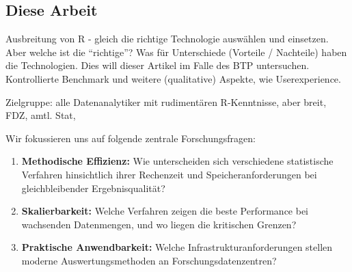 \documentclass[
  german,
  10pt,
  twoside]{article}
\begin{document}
\subsection{Diese Arbeit}\label{diese-arbeit}

Ausbreitung von R - gleich die richtige Technologie auswählen und
einsetzen. Aber welche ist die ``richtige''? Was für Unterschiede
(Vorteile / Nachteile) haben die Technologien. Dies will dieser Artikel
im Falle des BTP untersuchen. Kontrollierte Benchmark und weitere
(qualitative) Aspekte, wie Userexperience.

Zielgruppe: alle Datenanalytiker mit rudimentären R-Kenntnisse, aber
breit, FDZ, amtl. Stat,

Wir fokussieren uns auf folgende zentrale Forschungsfragen:

\begin{enumerate}
\def\labelenumi{\arabic{enumi}.}
\item
  \textbf{Methodische Effizienz:} Wie unterscheiden sich verschiedene
  statistische Verfahren hinsichtlich ihrer Rechenzeit und
  Speicheranforderungen bei gleichbleibender Ergebnisqualität?
\item
  \textbf{Skalierbarkeit:} Welche Verfahren zeigen die beste Performance
  bei wachsenden Datenmengen, und wo liegen die kritischen Grenzen?
\item
  \textbf{Praktische Anwendbarkeit:} Welche Infrastrukturanforderungen
  stellen moderne Auswertungsmethoden an Forschungsdatenzentren?
\end{enumerate}


\printbibliography
\end{document}
